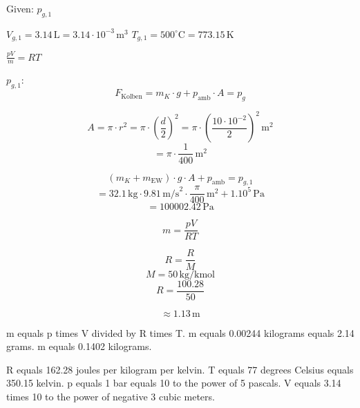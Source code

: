 Given: \( p_{g,1} \)  

\( V_{g,1} = 3.14 \, \text{L} = 3.14 \cdot 10^{-3} \, \text{m}^3 \)  
\( T_{g,1} = 500^\circ \text{C} = 773.15 \, \text{K} \)  

\( \frac{p V}{m} = R T \)  

\( p_{g,1} \):  
\[ F_{\text{Kolben}} = m_K \cdot g + p_{\text{amb}} \cdot A = p_g \]  

\[ A = \pi \cdot r^2 = \pi \cdot \left(\frac{d}{2}\right)^2 = \pi \cdot \left(\frac{10 \cdot 10^{-2}}{2}\right)^2 \, \text{m}^2 \]  
\[ = \pi \cdot \frac{1}{400} \, \text{m}^2 \]  

\[ (m_K + m_{\text{EW}}) \cdot g \cdot A + p_{\text{amb}} = p_{g,1} \]  
\[ = 32.1 \, \text{kg} \cdot 9.81 \, \text{m/s}^2 \cdot \frac{\pi}{400} \, \text{m}^2 + 1.10^5 \, \text{Pa} \]  
\[ = 100002.42 \, \text{Pa} \]  

\[ m = \frac{p V}{R T} \]  

\[ R = \frac{R}{M} \]  
\[ M = 50 \, \text{kg/kmol} \]  
\[ R = \frac{100.28}{50} \]  

\[ \approx 1.13 \, \text{m} \]

m equals p times V divided by R times T.  
m equals 0.00244 kilograms equals 2.14 grams.  
m equals 0.1402 kilograms.  

R equals 162.28 joules per kilogram per kelvin.  
T equals 77 degrees Celsius equals 350.15 kelvin.  
p equals 1 bar equals 10 to the power of 5 pascals.  
V equals 3.14 times 10 to the power of negative 3 cubic meters.
